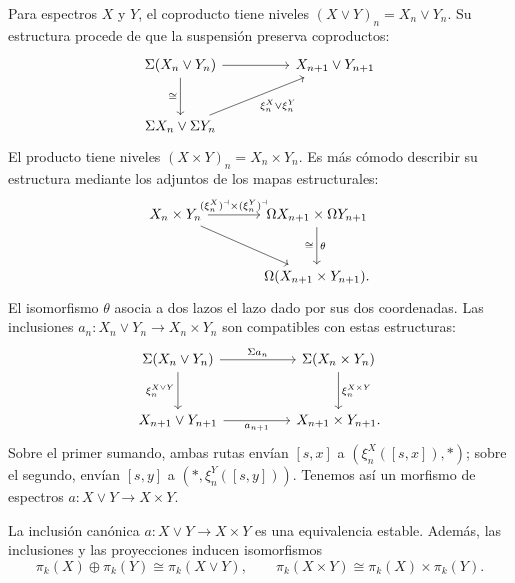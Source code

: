 Para espectros $X$ y $Y$, el coproducto tiene niveles $(X\vee Y)_n=X_n\vee Y_n$. Su estructura procede de que la suspensión preserva coproductos:
\[
\begin{tikzcd}[column sep=huge,row sep=large]
\Sigma(X_n\vee Y_n)\arrow[r]\arrow[d,"\cong"']&X_{n+1}\vee Y_{n+1}\\
\Sigma X_n\vee\Sigma Y_n\arrow[ur,"\xi_n^X\vee\xi_n^Y"']&
\end{tikzcd}
\]
El producto tiene niveles $(X\times Y)_n=X_n\times Y_n$. Es más cómodo describir su estructura mediante los adjuntos de los mapas estructurales:
\[
\begin{tikzcd}[column sep=large,row sep=large]
X_n\times Y_n\arrow[r,"(\xi_n^X)^\dashv\times(\xi_n^Y)^\dashv"]\arrow[dr]
&\Omega X_{n+1}\times\Omega Y_{n+1}\arrow[d,"\theta","\cong"']\\
&\Omega(X_{n+1}\times Y_{n+1}).
\end{tikzcd}
\]
El isomorfismo $\theta$ asocia a dos lazos el lazo dado por sus dos coordenadas. Las inclusiones $a_n\colon X_n\vee Y_n\to X_n\times Y_n$ son compatibles con estas estructuras:
\[
\begin{tikzcd}[column sep=huge,row sep=large]
\Sigma(X_n\vee Y_n)\arrow[r,"\Sigma a_n"]\arrow[d,"\xi_n^{X\vee Y}"']
&\Sigma(X_n\times Y_n)\arrow[d,"\xi_n^{X\times Y}"]\\
X_{n+1}\vee Y_{n+1}\arrow[r,"a_{n+1}"']&X_{n+1}\times Y_{n+1}.
\end{tikzcd}
\]
Sobre el primer sumando, ambas rutas envían $[s,x]$ a $(\xi_n^X([s,x]),*)$; sobre el segundo, envían $[s,y]$ a $(*,\xi_n^Y([s,y]))$. Tenemos así un morfismo de espectros $a\colon X\vee Y\to X\times Y$.

\begin{prop}\label{prop:c17-coproducto-producto}
La inclusión canónica $a\colon X\vee Y\to X\times Y$ es una equivalencia estable. Además, las inclusiones y las proyecciones inducen isomorfismos
\[
\pi_k(X)\oplus\pi_k(Y)\cong\pi_k(X\vee Y),
\qquad
\pi_k(X\times Y)\cong\pi_k(X)\times\pi_k(Y).
\]
\end{prop}

